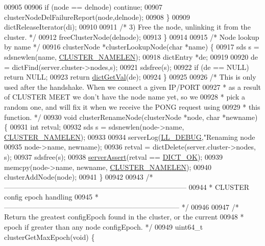 \begin{DoxyCode}
{{{{{{{{{{{00905 
00906         \textcolor{keywordflow}{if} (node == delnode) \textcolor{keywordflow}{continue};
00907         clusterNodeDelFailureReport(node,delnode);
00908     \}
00909     dictReleaseIterator(di);
00910 
00911     \textcolor{comment}{/* 3) Free the node, unlinking it from the cluster. */}
00912     freeClusterNode(delnode);
00913 \}
00914 
00915 \textcolor{comment}{/* Node lookup by name */}
00916 clusterNode *clusterLookupNode(\textcolor{keywordtype}{char} *name) \{
00917     sds s = sdsnewlen(name, \hyperlink{cluster_8h_ace7a882972eff7149675252938643b6e}{CLUSTER\_NAMELEN});
00918     dictEntry *de;
00919 
00920     de = dictFind(server.cluster->nodes,s);
00921     sdsfree(s);
00922     \textcolor{keywordflow}{if} (de == NULL) \textcolor{keywordflow}{return} NULL;
00923     \textcolor{keywordflow}{return} \hyperlink{dict_8h_ae8d2cc391873b2bea2b87c4f80f43120}{dictGetVal}(de);
00924 \}
00925 
00926 \textcolor{comment}{/* This is only used after the handshake. When we connect a given IP/PORT}
00927 \textcolor{comment}{ * as a result of CLUSTER MEET we don't have the node name yet, so we}
00928 \textcolor{comment}{ * pick a random one, and will fix it when we receive the PONG request using}
00929 \textcolor{comment}{ * this function. */}
00930 \textcolor{keywordtype}{void} clusterRenameNode(clusterNode *node, \textcolor{keywordtype}{char} *newname) \{
00931     \textcolor{keywordtype}{int} retval;
00932     sds s = sdsnewlen(node->name, \hyperlink{cluster_8h_ace7a882972eff7149675252938643b6e}{CLUSTER\_NAMELEN});
00933 
00934     serverLog(\hyperlink{server_8h_abcaffe365dee628fcf9fc90c69d534a1}{LL\_DEBUG},\textcolor{stringliteral}{"Renaming node %
00935         node->name, newname);
00936     retval = dictDelete(server.cluster->nodes, s);
00937     sdsfree(s);
00938     \hyperlink{server_8h_a88114b5169b4c382df6b56506285e56a}{serverAssert}(retval == \hyperlink{dict_8h_a2afecbeab8f7efbc183048f52f6d17e5}{DICT\_OK});
00939     memcpy(node->name, newname, \hyperlink{cluster_8h_ace7a882972eff7149675252938643b6e}{CLUSTER\_NAMELEN});
00940     clusterAddNode(node);
00941 \}
00942 
00943 \textcolor{comment}{/* -----------------------------------------------------------------------------}
00944 \textcolor{comment}{ * CLUSTER config epoch handling}
00945 \textcolor{comment}{ * -------------------------------------------------------------------------- */}
00946 
00947 \textcolor{comment}{/* Return the greatest configEpoch found in the cluster, or the current}
00948 \textcolor{comment}{ * epoch if greater than any node configEpoch. */}
00949 uint64\_t clusterGetMaxEpoch(\textcolor{keywordtype}{void}) \{
}}}}}}}}}}}}
\end{DoxyCode}
